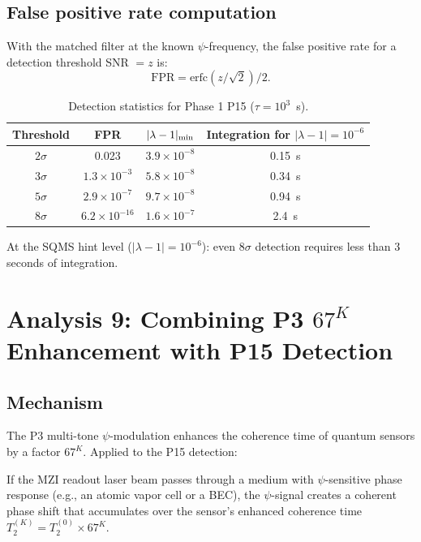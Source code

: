 \documentclass[11pt]{article}
\newcommand{\ee}[1]{\times 10^{#1}}
\newcommand{\lam}{\lambda}
\begin{document}
\subsection{False positive rate computation}

With the matched filter at the known $\psi$-frequency, the false
positive rate for a detection threshold SNR $= z$ is:
\begin{equation}
\text{FPR} = \text{erfc}(z/\sqrt{2})/2.
\end{equation}

\begin{table}[H]
\centering
\caption{Detection statistics for Phase 1 P15 ($\tau = 10^3$~s).}
\begin{tabular}{cccc}
\toprule
Threshold & FPR & $|\lam-1|_{\rm min}$ & Integration for $|\lam-1| = 10^{-6}$ \\
\midrule
$2\sigma$ & 0.023 & $3.9\ee{-8}$ & 0.15~s \\
$3\sigma$ & $1.3\ee{-3}$ & $5.8\ee{-8}$ & 0.34~s \\
$5\sigma$ & $2.9\ee{-7}$ & $9.7\ee{-8}$ & 0.94~s \\
$8\sigma$ & $6.2\ee{-16}$ & $1.6\ee{-7}$ & 2.4~s \\
\bottomrule
\end{tabular}
\end{table}

At the SQMS hint level ($|\lam-1| = 10^{-6}$): even $8\sigma$
detection requires less than 3 seconds of integration.

\section{Analysis 9: Combining P3 $67^K$ Enhancement with P15 Detection}
\label{sec:67K-P15}

\subsection{Mechanism}

The P3 multi-tone $\psi$-modulation enhances the coherence time of
quantum sensors by a factor $67^K$. Applied to the P15 detection:

If the MZI readout laser beam passes through a medium with
$\psi$-sensitive phase response (e.g., an atomic vapor cell or
a BEC), the $\psi$-signal creates a coherent phase shift that
accumulates over the sensor's enhanced coherence time $T_2^{(K)}
= T_2^{(0)} \times 67^K$.
\end{document}
